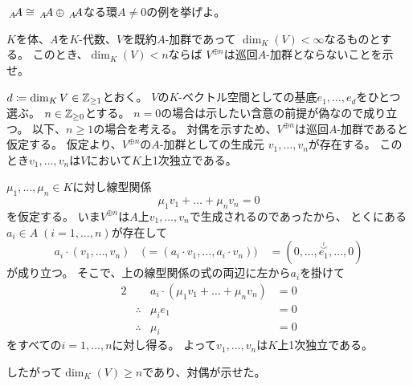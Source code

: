 \documentclass[report]{jlreq}
\begin{document}
\begin{problem}[代数学II 4.56]
    $\,{}_{A}\!A \cong \,{}_{A}\!A \oplus \,{}_{A}\!A$なる環$A \neq 0$の例を挙げよ。
\end{problem}

\begin{answer}
\end{answer}

\begin{problem}[代数学II 4.57]
    $K$を体、$A$を$K$-代数、$V$を既約$A$-加群であって
    $\dim_K(V) < \infty$なるものとする。
    このとき、$\dim_K(V) < n$ならば
    $V^{\oplus n}$は巡回$A$-加群とならないことを示せ。
\end{problem}

\begin{answer}
    $d \coloneqq \dim_K V \in \mathbb{Z}_{\ge 1}$とおく。
    $V$の$K$-ベクトル空間としての基底$e_1, \dots, e_d$をひとつ選ぶ。
    $n \in \mathbb{Z}_{\ge 0}$とする。
    $n = 0$の場合は示したい含意の前提が偽なので成り立つ。
    以下、$n \ge 1$の場合を考える。
    対偶を示すため、$V^{\oplus n}$は巡回$A$-加群であると仮定する。
    仮定より、$V^{\oplus n}$の$A$-加群としての生成元
    $v_1, \dots, v_n$が存在する。
    このとき$v_1, \dots, v_n$は$V$において$K$上1次独立である。
    \begin{innerproof}
        $\mu_1, \dots, \mu_n \in K$に対し線型関係
        \begin{equation}
            \mu_1 v_1 + \dots + \mu_n v_n = 0
        \end{equation}
        を仮定する。
        いま$V^{\oplus n}$は$A$上$v_1, \dots, v_n$で生成されるのであったから、
        とくにある$a_i \in A \; (i = 1, \dots, n)$が存在して
        \begin{equation}
            a_i \cdot (v_1, \dots, v_n) \quad
                \bigl(= (a_i \cdot v_1, \dots, a_i \cdot v_n) \bigr) \quad
                = (0, \dots, \overset{\stackrel{i}{\smile}}{e_1}, \dots, 0)
        \end{equation}
        が成り立つ。
        そこで、上の線型関係の式の両辺に左から$a_i$を掛けて
        \begin{alignat}{2}
            && a_i \cdot (\mu_1 v_1 + \dots + \mu_n v_n) &= 0 \\
            &\therefore& \mu_i e_1 &= 0 \\
            &\therefore& \mu_i &= 0
        \end{alignat}
        をすべての$i = 1, \dots, n$に対し得る。
        よって$v_1, \dots, v_n$は$K$上1次独立である。
    \end{innerproof}
    したがって$\dim_K(V) \ge n$であり、対偶が示せた。
\end{answer}
\end{document}
